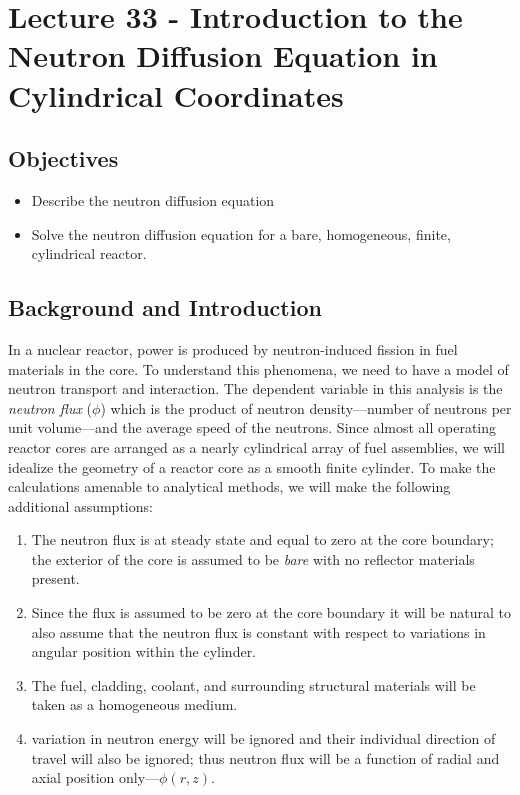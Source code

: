 \chapter{Lecture 33 - Introduction to the Neutron Diffusion Equation in Cylindrical Coordinates}
\label{ch:lec33}
\section{Objectives}
\begin{itemize}
\item Describe the neutron diffusion equation
\item Solve the neutron diffusion equation for a bare, homogeneous, finite, cylindrical reactor. 
\end{itemize}
\setcounter{lstannotation}{0}

\section{Background and Introduction}
In a nuclear reactor, power is produced by neutron-induced fission in fuel materials in the core.  To understand this phenomena, we need to have a model of neutron transport and interaction.  The dependent variable in this analysis is the \emph{neutron flux} ($\phi$) which is the product of neutron density---number of neutrons per unit volume---and the average speed of the neutrons.  Since almost all operating reactor cores are arranged as a nearly cylindrical array of fuel assemblies, we will idealize the geometry of a reactor core as a smooth finite cylinder.  To make the calculations amenable to analytical methods, we will make the following additional assumptions:
\begin{enumerate}
\item The neutron flux is at steady state and equal to zero at the core boundary; the exterior of the core is assumed to be \emph{bare} with no reflector materials present.  
\item Since the flux is assumed to be zero at the core boundary it will be natural to also assume that the neutron flux is constant with respect to variations in angular position within the cylinder.
\item The fuel, cladding, coolant, and surrounding structural materials will be taken as a homogeneous medium.
\item variation in neutron energy will be ignored and their individual direction of travel will also be ignored; thus neutron flux will be a function of radial and axial position only---$\phi(r,z)$.
\end{enumerate}

